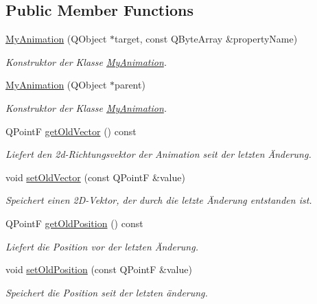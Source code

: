 \subsection*{Public Member Functions}
\begin{DoxyCompactItemize}
\item 
\hyperlink{class_my_animation_afec096e94a98045d3cf87bf4dd247637}{My\-Animation} (Q\-Object $\ast$target, const Q\-Byte\-Array \&property\-Name)
\begin{DoxyCompactList}\small\item\em Konstruktor der Klasse \hyperlink{class_my_animation}{My\-Animation}. \end{DoxyCompactList}\item 
\hyperlink{class_my_animation_a68db19894ccd22277aff4c862a168cfe}{My\-Animation} (Q\-Object $\ast$parent)
\begin{DoxyCompactList}\small\item\em Konstruktor der Klasse \hyperlink{class_my_animation}{My\-Animation}. \end{DoxyCompactList}\item 
Q\-Point\-F \hyperlink{class_my_animation_a3e092d8b292b2317fc9136c0d78ab984}{get\-Old\-Vector} () const 
\begin{DoxyCompactList}\small\item\em Liefert den 2d-\/\-Richtungsvektor der Animation seit der letzten Änderung. \end{DoxyCompactList}\item 
void \hyperlink{class_my_animation_a3c83b6a68871f54a5a561c134db4cba2}{set\-Old\-Vector} (const Q\-Point\-F \&value)
\begin{DoxyCompactList}\small\item\em Speichert einen 2\-D-\/\-Vektor, der durch die letzte Änderung entstanden ist. \end{DoxyCompactList}\item 
Q\-Point\-F \hyperlink{class_my_animation_a6dddda03203449e45354405d14ffb436}{get\-Old\-Position} () const 
\begin{DoxyCompactList}\small\item\em Liefert die Position vor der letzten Änderung. \end{DoxyCompactList}\item 
void \hyperlink{class_my_animation_adb71d57fddec8dd3ef563f6f0b386710}{set\-Old\-Position} (const Q\-Point\-F \&value)
\begin{DoxyCompactList}\small\item\em Speichert die Position seit der letzten änderung. \end{DoxyCompactList}\end{DoxyCompactItemize}



